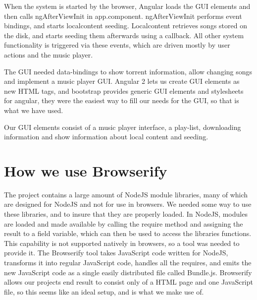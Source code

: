 When the system is started by the browser,
Angular loads the \acs{GUI} elements and then calls ngAfterViewInit in app.component.
ngAfterViewInit performs event bindings, and starts localcontent seeding.
Localcontent retrieves songs stored on the disk, and starts seeding them afterwards using a callback.
All other system functionality is triggered via these events, 
which are driven mostly by user actions and the music player.
\newline

The \acs{GUI} needed data-bindings to show torrent information, allow changing songs
and implement a music player \acs{GUI}. 
Angular 2 lets us create \acs{GUI} elements as new \acs{HTML} tags, 
and bootstrap provides generic \acs{GUI} elements and stylesheets for angular, 
they were the easiest way to fill our needs for the \acs{GUI},
so that is what we have used.

Our \acs{GUI} elements consist of a music player interface, a play-list, downloading information 
and show information about local content and seeding.
\newline

\section{How we use Browserify}
The project contains a large amount of NodeJS module libraries, 
many of which are designed for NodeJS and not for use in browsers.
We needed some way to use these libraries, and to insure that they are properly loaded.
In NodeJS, modules are loaded and made available by calling the require method 
and assigning the result to a field variable, which can then be used to access the libraries functions.
This capability is not supported natively in browsers, so a tool was needed to provide it.
The Browserify tool takes JavaScript code written for NodeJS, 
transforms it into regular JavaScript code, 
handles all the requires, 
and emits the new JavaScript code as a single easily distributed file called Bundle.js.
Browserify allows our projects end result to consist only of a \acs{HTML} page and one JavaScript file, 
so this seems like an ideal setup, and is what we make use of.
\newline


